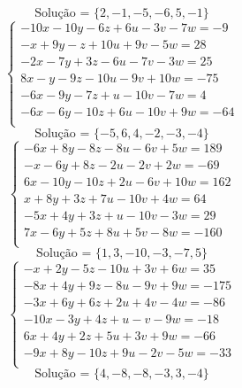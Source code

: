 \documentclass[12pt,oneside,a4paper]{article}
\begin{document}
\begin{equation*}
\text{Solução = }\{2,-1,-5,-6,5,-1\}
\end{equation*}
\vspace{\baselineskip}
\begin{equation*}
\begin{cases}
-10x-10y-6z+6u-3v-7w=-9 \\
-x+9y-z+10u+9v-5w=28 \\
-2x-7y+3z-6u-7v-3w=25 \\
8x-y-9z-10u-9v+10w=-75 \\
-6x-9y-7z+u-10v-7w=4 \\
-6x-6y-10z+6u-10v+9w=-64 \\
\end{cases}
\end{equation*}
\begin{equation*}
\text{Solução = }\{-5,6,4,-2,-3,-4\}
\end{equation*}
\vspace{\baselineskip}
\begin{equation*}
\begin{cases}
-6x+8y-8z-8u-6v+5w=189 \\
-x-6y+8z-2u-2v+2w=-69 \\
6x-10y-10z+2u-6v+10w=162 \\
x+8y+3z+7u-10v+4w=64 \\
-5x+4y+3z+u-10v-3w=29 \\
7x-6y+5z+8u+5v-8w=-160 \\
\end{cases}
\end{equation*}
\begin{equation*}
\text{Solução = }\{1,3,-10,-3,-7,5\}
\end{equation*}
\vspace{\baselineskip}
\begin{equation*}
\begin{cases}
-x+2y-5z-10u+3v+6w=35 \\
-8x+4y+9z-8u-9v+9w=-175 \\
-3x+6y+6z+2u+4v-4w=-86 \\
-10x-3y+4z+u-v-9w=-18 \\
6x+4y+2z+5u+3v+9w=-66 \\
-9x+8y-10z+9u-2v-5w=-33 \\
\end{cases}
\end{equation*}
\begin{equation*}
\text{Solução = }\{4,-8,-8,-3,3,-4\}
\end{equation*}
\end{document}
